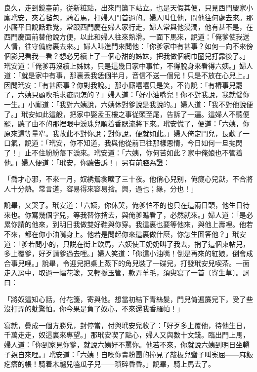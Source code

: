 良久，走到鏡臺前，従新粧點，出來門簾下站立。也是天假其便，只見西門慶家小廝玳安，夾着毡包，騎着馬，打婦人門首過的。婦人叫住他，問他往何處去來。那小廝平日說話乖覺，常跟西門慶在婦人家行走，婦人常與他浸潤，他有甚不是，在西門慶面前替他說方便，以此和婦人往來熟滑。一面下馬來，說道：「俺爹使我送人情，往守備府裏去來。」婦人叫進門來問他：「你爹家中有甚事？如何一向不來傍個影兒看我一看？想必另續上了一個心甜的姊妹，把我做個網巾圈兒打靠後了。」玳安道：「俺爹再沒續上姊妹，只是這幾日家中事忙，不得脫身來看得六姨。」婦人道：「就是家中有事，那裏丢我恁個半月，音信不送一個兒！只是不放在心兒上。」因問玳安：「有甚麽事？你對我說。」那小廝嘻嘻只是笑，不肯說：「有樁事兒罷了，六姨只顧吹毛求疵問怎的？」婦人道：「好小油嘴兒！你不對我說，我就惱你一生。」小廝道：「我對六姨說，六姨休對爹說是我說的。」婦人道：「我不對他說便了。」玳安如此這般，把家中娶孟玉樓之事従頭至尾，告訴了一遍。這婦人不聽便罷，聽了由不的那裡眼中淚珠兒順着香腮流將下來。玳安慌了，便道：「六姨，你原來這等量窄。我故此不對你說；對你說，便就如此。」婦人倚定門兒，長歎了一口氣，說道：「玳安，你不知道，我與他從前已往那樣恩情，今日如何一旦抛閃了！」止不住紛紛落下淚來。玳安道：「六姨，你何苦如此？家中俺娘也不管着他。」婦人便道：「玳安，你聽告訴！」另有前腔為證：

\begin{myquote}
「喬才心邪，不來一月，奴綉鴛衾曠了三十夜。他俏心兒别，俺癡心兒獃，不合將人十分熱。常言道，容易得來容易捨。興，過也；緣，分也！」
\end{myquote}

說畢，又哭了。玳安道：「六姨，你休哭，俺爹怕不的也只在這兩日頭，他生日待來也。你寫幾個字兒，等我替你捎去，與俺爹瞧看了，必然就來。」婦人道：「是必累你請的他來，到明日我做雙好鞋與你穿。我這裏也要等他來，與他上壽哩。他若不來，都在你小油嘴身上。他若是問起你來這裏做什麽，你怎生囬答他？」玳安道：「爹若問小的，只説在街上飲馬，六姨使王奶奶叫了我去，捎了這個柬帖兒，多上覆爹，好歹請爹過去哩。」婦人笑道：「你這小油嘴！倒是再來的紅娘，倒會成合事兒哩。」說畢，令迎兒把桌上蒸下的角兒裝了一碟兒，打發玳安兒喫茶。一面走入房中，取過一幅花箋，又輕撚玉管，款弄羊毛，須臾寫了一首〔寄生草〕。詞曰：
\begin{myquote}
「將奴這知心話，付花箋，寄與他。想當初結下青絲髮，門兒倚遍簾兒下，受了些沒打弄的躭驚怕。你今果是負了奴心，不來還我香羅帕！」
\end{myquote}

寫就，疊成一個方勝兒，封停當，付與玳安兒收了：「好歹多上覆他，待他生日，千萬走走，奴這裏來專望。」那玳安喫了點心，婦人又與數十文錢。臨出門上馬，婦人道：「你到家見你爹，就說六姨好不罵你。他若不來，你就說六姨到明日坐轎子親自來哩。」玳安道：「六姨！自喫你賣粉團的撞見了敲板兒蠻子叫寃屈——麻飯疙瘩的帳！騎着木驢兒嗑瓜子兒——瑣碎昏昏。」說畢，騎上馬去了。

